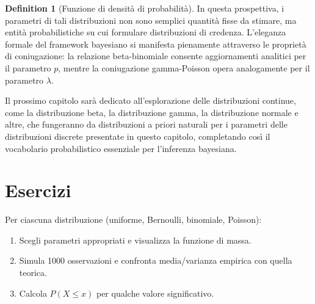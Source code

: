 \documentclass[
  letterpaper,
  DIV=11,
  numbers=noendperiod,
  oneside]{scrreprt}
\providecommand{\tightlist}{%
  \setlength{\itemsep}{0pt}\setlength{\parskip}{0pt}}
\theoremstyle{definition}
\theoremstyle{plain}
\theoremstyle{definition}
\newtheorem{definition}{Definition}[chapter]
\theoremstyle{remark}
\begin{document}
\begin{definition}[Funzione di densità di
probabilità]
In questa prospettiva, i parametri di tali distribuzioni non sono
semplici quantità fisse da stimare, ma entità probabilistiche su cui
formulare distribuzioni di credenza. L'eleganza formale del framework
bayesiano si manifesta pienamente attraverso le proprietà di
coniugazione: la relazione beta-binomiale consente aggiornamenti
analitici per il parametro \(p\), mentre la coniugazione gamma-Poisson
opera analogamente per il parametro \(\lambda\).

Il prossimo capitolo sarà dedicato all'esplorazione delle distribuzioni
continue, come la distribuzione beta, la distribuzione gamma, la
distribuzione normale e altre, che fungeranno da distribuzioni a priori
naturali per i parametri delle distribuzioni discrete presentate in
questo capitolo, completando così il vocabolario probabilistico
essenziale per l'inferenza bayesiana.

\section*{Esercizi}\label{esercizi-2}


\begin{tcolorbox}[enhanced jigsaw, arc=.35mm, breakable, colbacktitle=quarto-callout-important-color!10!white, opacityback=0, toprule=.15mm, rightrule=.15mm, colback=white, opacitybacktitle=0.6, leftrule=.75mm, coltitle=black, bottomtitle=1mm, left=2mm, toptitle=1mm, title=\textcolor{quarto-callout-important-color}{\faExclamation}\hspace{0.5em}{Esercizi di base}, titlerule=0mm, bottomrule=.15mm, colframe=quarto-callout-important-color-frame]

Per ciascuna distribuzione (uniforme, Bernoulli, binomiale, Poisson):

\begin{enumerate}
\def\labelenumi{\arabic{enumi}.}
\tightlist
\item
  Scegli parametri appropriati e visualizza la funzione di massa.
\item
  Simula 1000 osservazioni e confronta media/varianza empirica con
  quella teorica.
\item
  Calcola \(P(X \leq x)\) per qualche valore significativo.
\end{enumerate}

\end{tcolorbox}

\begin{tcolorbox}[enhanced jigsaw, arc=.35mm, breakable, colbacktitle=quarto-callout-important-color!10!white, opacityback=0, toprule=.15mm, rightrule=.15mm, colback=white, opacitybacktitle=0.6, leftrule=.75mm, coltitle=black, bottomtitle=1mm, left=2mm, toptitle=1mm, title=\textcolor{quarto-callout-important-color}{\faExclamation}\hspace{0.5em}{Esercizi bayesiani}, titlerule=0mm, bottomrule=.15mm, colframe=quarto-callout-important-color-frame]


\end{tcolorbox}
\end{definition}
\end{document}
